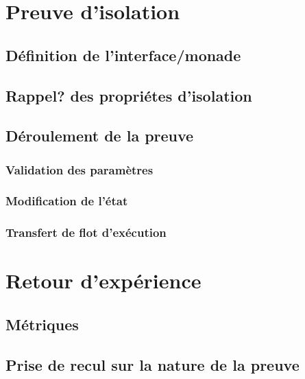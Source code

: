 	\section{Preuve d'isolation}
		\subsection{Définition de l'interface/monade}
		\subsection{Rappel? des propriétes d'isolation}
		
		\subsection{Déroulement de la preuve}
			\subsubsection{Validation des paramètres}
			\subsubsection{Modification de l'état}
			\subsubsection{Transfert de flot d'exécution}

	\section{Retour d'expérience}
		\subsection{Métriques}
		\subsection{Prise de recul sur la nature de la preuve}
